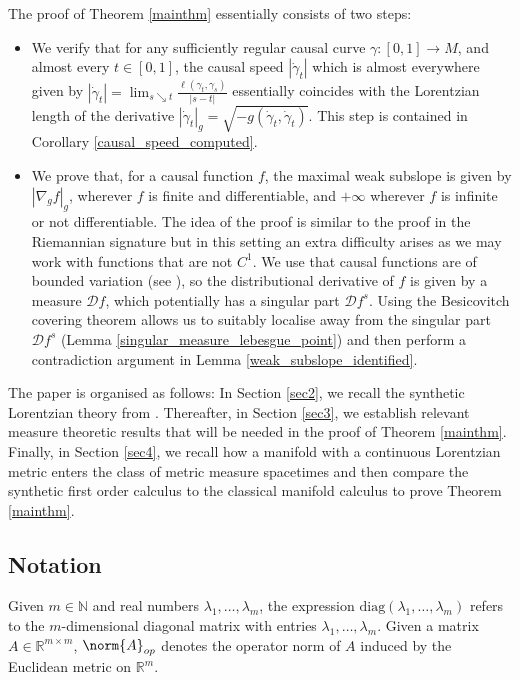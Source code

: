 \documentclass[a4paper,10pt]{article}
\numberwithin{equation}{section}
\newcommand{\R}{\mathbb{R}}
\newcommand{\N}{\mathbb{N}}
\begin{document}
The proof of Theorem \ref{mainthm} essentially consists of two steps: 
\begin{itemize}
    \item We verify that for any sufficiently regular causal curve $\gamma\colon [0,1] \to M$, and almost every $t \in [0,1]$, the causal speed $|\dot{\gamma}_t|$ which is almost everywhere given by $|\dot{\gamma}_t|=\lim_{s \searrow t} \frac{\ell(\gamma_t, \gamma_s)}{|s-t|}$ essentially coincides with the Lorentzian length of the derivative $|\dot{\gamma}_t|_g =\sqrt{-g(\dot{\gamma}_t,\dot{\gamma}_t)}$. This step is contained in Corollary \ref{causal_speed_computed}.
    \item We prove that, for a causal function $f$, the maximal weak subslope is given by $|\nabla_g f|_g$, wherever $f$ is finite and differentiable, and $+\infty$ wherever $f$ is infinite or not differentiable. The idea of the proof is similar to the proof in the Riemannian signature \cite[Proposition 4.24]{mondino2025equivalence} but in this setting an extra difficulty arises as we may work with functions that are not $C^1$. We use that causal functions are of bounded variation (see \cite{beran2024nonlinear}), so the distributional derivative of $f$ is given by a measure $\mathcal{D}f$, which potentially has a singular part $\mathcal{D}f^s$. Using the Besicovitch covering theorem allows us to suitably localise away from the singular part $\mathcal{D}f^s$ (Lemma \ref{singular_measure_lebesgue_point}) and then perform a contradiction argument in Lemma \ref{weak_subslope_identified}. 
\end{itemize}

The paper is organised as follows: In Section \ref{sec2}, we recall the synthetic Lorentzian theory from \cite{beran2024nonlinear}. Thereafter, in Section \ref{sec3}, we establish relevant measure theoretic results that will be needed in the proof of Theorem \ref{mainthm}. Finally, in Section \ref{sec4}, we recall how a manifold with a continuous Lorentzian metric enters the class of metric measure spacetimes and then compare the synthetic first order calculus to the classical manifold calculus to prove Theorem \ref{mainthm}.

\subsection*{Notation}
Given $m \in \N$ and real numbers $\lambda_1, \ldots, \lambda_m$, the expression $\mathrm{diag}(\lambda_1, \ldots, \lambda_m)$ refers to the $m$-dimensional diagonal matrix with entries $\lambda_1, \ldots, \lambda_m$. Given a matrix $A \in \R^{m \times m}$, $\norm{A}_{op}$ denotes the operator norm of $A$ induced by the Euclidean metric on $\R^m$.
\end{document}
